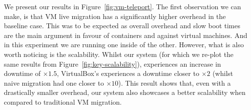 We present our results in Figure~\ref{fig:vm-teleport}.
The first observation we can make, is that VM live migration has a significantly higher overhead in the baseline case.
This was to be expected as overall overhead and slow boot times are the main argument in favour of containers and against virtual machines.
And in this experiment we are running one inside of the other.
However, what is also worth noticing is the scalability.
Whilst our system (for which we re-plot the same results from Figure~\ref{fig:key-scalability}), experiences an increase in downtime of $\times 1.5$, VirtualBox's experiences a downtime closer to $\times 2$ (whilst naive migration had one closer to $\times 10$).
This result shows that, even with a drastically smaller overhead, our system also showcases a better scalability when compared to traditional VM migration.

